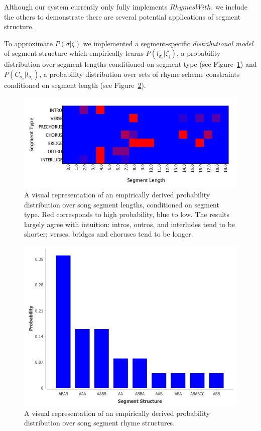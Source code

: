 \documentclass[letterpaper]{article}
\begin{document}
Although our system currently only fully implements $RhymesWith$, we include the others to demonstrate there are several potential applications of segment structure.

To approximate $P(\sigma|\zeta)$ we implemented a segment-specific \emph{distributional model} of segment structure which empirically learns $P(l_{\sigma_i}|\zeta_i)$, a probability distribution over segment lengths conditioned on segment type (see Figure~\ref{fig:measure_count_by_segment}) and $P(C_{\sigma_i} | l_{\sigma_i})$, a probability distribution over sets of rhyme scheme constraints conditioned on segment length (see Figure~\ref{fig:segment_structure}).

\begin{figure}
	\centering
	\includegraphics[width=\linewidth]{measure_count_by_segment}
	\caption{\label{fig:measure_count_by_segment} A visual representation of an empirically derived probability distribution over song segment lengths, conditioned on segment type. Red corresponds to high probability, blue to low. The results largely agree with intuition: intros, outros, and interludes tend to be shorter; verses, bridges and choruses tend to be longer.}
\end{figure}

\begin{figure}
	\centering
	\includegraphics[width=\linewidth]{segment_structure}
	\caption{\label{fig:segment_structure} A visual representation of an empirically derived probability distribution over song segment rhyme structures.}
\end{figure}
\end{document}
